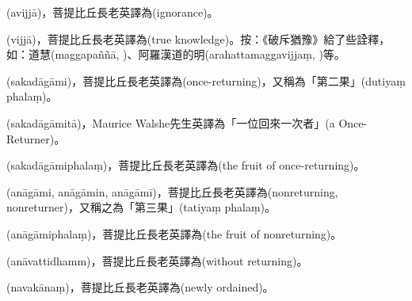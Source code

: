 \startitemgroup[noteitems]
\item{}(avijjā)，菩提比丘長老英譯為(ignorance)。
\item{}(vijjā)，菩提比丘長老英譯為(true knowledge)。按：《破斥猶豫》給了些詮釋，如：道慧(maggapaññā, )、阿羅漢道的明(arahattamaggavijjaṃ, )等。
\stopitemgroup

\startitemgroup[noteitems]
\item{}(sakadāgāmi)，菩提比丘長老英譯為(once-returning)，又稱為「第二果」(dutiyaṃ phalaṃ)。
\item{}(sakadāgāmitā)，Maurice Walshe先生英譯為「一位回來一次者」(a Once-Returner)。
\item{}(sakadāgāmiphalaṃ)，菩提比丘長老英譯為(the fruit of once-returning)。
\stopitemgroup

\startitemgroup[noteitems]
\item{}(anāgāmi, anāgāmin, anāgāmī)，菩提比丘長老英譯為(nonreturning, nonreturner)，又稱之為「第三果」(tatiyaṃ phalaṃ)。
\item{}(anāgāmiphalaṃ)，菩提比丘長老英譯為(the fruit of nonreturning)。
\item{}(anāvattidhamm)，菩提比丘長老英譯為(without returning)。
\stopitemgroup

\startitemgroup[noteitems]
\item{}(navakānaṃ)，菩提比丘長老英譯為(newly ordained)。
\stopitemgroup

